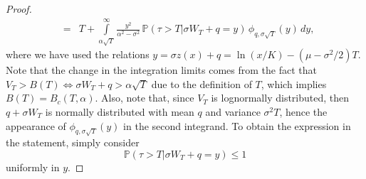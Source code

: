 \documentclass[10pt,a4paper]{amsart}
\begin{document}
\begin{proof}
\begin{eqnarray}
&=&
T + \int\limits_{\alpha\sqrt{T}}^\infty\frac{y^2}{\alpha^2 - \sigma^2} \, \mathbb{P}(\tau>T\vert \sigma W_T+q=y) \, \phi_{q,\sigma \sqrt{T}}(y) \, dy,
\end{eqnarray}
where we have used the relations $y=\sigma z(x)+q=\ln(x/K)-(\mu-\sigma^2/2)T$. Note that the change in the integration limits comes from the fact that $V_T>B(T)\Leftrightarrow \sigma W_T+q>\alpha\sqrt{T}$ due to the definition of $T$, which implies $B(T)=B_c(T,\alpha)$. Also, note that, since $V_T$ is lognormally distributed, then $q+\sigma W_T$ is normally distributed with mean $q$ and variance $\sigma^2T$, hence the appearance of $\phi_{q,\sigma\sqrt{T}}(y)$ in the second integrand. To obtain the expression in the statement, simply consider
$$
\mathbb{P}(\tau>T\vert \sigma W_T+q=y)\leq 1
$$
uniformly in $y$.


\end{proof}
\end{document}
